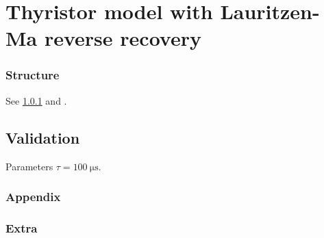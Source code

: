 \chapter{Thyristor model with Lauritzen-Ma reverse recovery}
\label{ch:thyristor-rr}

\renewcommand{\Vf}{V_{TM}}
\subsection{Structure}
\label{thyristor-rr:sec:struct}
See \ref{thyristor-rr:sec:struct} and \cite{lauritzen1991,courtay1995}.
\section{Validation}
Parameters $\tau=\SI{100}{\micro\second}$.
\subsection*{Appendix}
\subsection{Extra}

\renewcommand{\Vf}{V_{F}}
